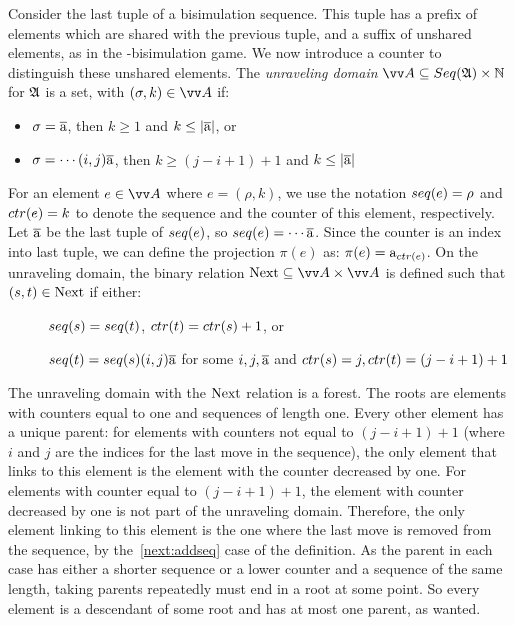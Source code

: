 Consider the last tuple of a bisimulation sequence.
This tuple has a prefix of elements which are shared with the previous tuple, and a suffix of unshared elements, as in the \FGF-bisimulation game.
We now introduce a counter to distinguish these unshared elements.
The \emph{unraveling domain} $\unraveldom{A} \subseteq \Seq{A} \times \mathbb{N}$ for ${\mathfrak{A}}$ is a set, with $(\sigma, k) \in \unraveldom{A}$ if:
\begin{itemize}
  \item $\sigma = \overline{\mathrm{a}}$, then $k \ge 1$ and $k \le |\overline{\mathrm{a}}|$, or
  \item $\sigma = \cdots (i,j) \overline{\mathrm{a}}$, then $k \ge (j-i+1) + 1$ and $k \le |\overline{\mathrm{a}}|$
\end{itemize}
For an element $e \in \unraveldom{A}$ where $e = (\rho, k)$, we use the notation $\seq{e} = \rho$ and $\ctr{e} = k$ to denote the sequence and the counter of this element, respectively.
Let $\overline{\mathrm{a}}$ be the last tuple of $\seq{e}$, so $\seq{e} = \cdots \elemtuplea$.
Since the counter is an index into last tuple, we can define the projection $\pi(e)$ as: $\pi(e) = \elema_{\ctr{e}}$.
On the unraveling domain, the binary relation $\relNext \subseteq \unraveldom{A} \times \unraveldom{A}$ is defined such that $(s, t) \in \mathrm{Next}$ if either:
\begin{description}
  \item[] $\seq{s} = \seq{t}$, $\ctr{t} = \ctr{s} + 1$, or
  \item[] $\seq{t} = \seq{s} (i,j) \elemtuplea$ for some $i, j, \overline{\mathrm{a}}$ and $\ctr{s} = j, \ctr{t} = (j - i + 1) + 1$
\end{description}
The unraveling domain with the $\mathrm{Next}$ relation is a forest.
The roots are elements with counters equal to one and sequences of length one.
Every other element has a unique parent: for elements with counters not equal to $(j - i + 1) + 1$ (where $i$ and $j$ are the indices for the last move in the sequence), the only element that links to this element is the element with the counter decreased by one.
For elements with counter equal to $(j - i + 1) + 1$, the element with counter decreased by one is not part of the unraveling domain.
Therefore, the only element linking to this element is the one where the last move is removed from the sequence, by the~\ref{next:addseq} case of the definition.
As the parent in each case has either a shorter sequence or a lower counter and a sequence of the same length, taking parents repeatedly must end in a root at some point.
So every element is a descendant of some root and has at most one parent, as wanted.

